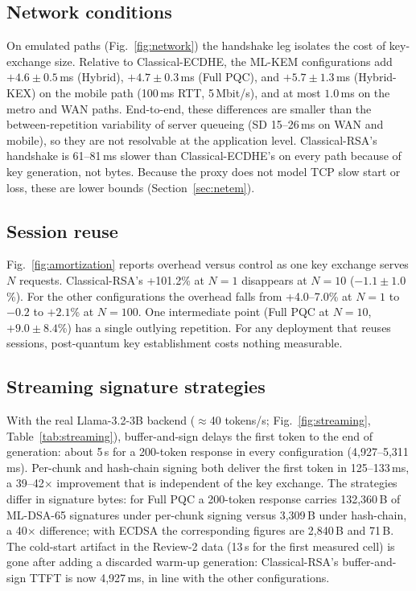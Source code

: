 \subsection{Network conditions}\label{sec:res-network}
On emulated paths (Fig.~\ref{fig:network}) the handshake leg isolates the cost of key-exchange size.
Relative to Classical-ECDHE, the ML-KEM configurations add $+4.6\pm0.5$\,ms (Hybrid),
$+4.7\pm0.3$\,ms (Full PQC), and $+5.7\pm1.3$\,ms (Hybrid-KEX) on the mobile path (100\,ms RTT,
5\,Mbit/s), and at most $1.0$\,ms on the metro and WAN paths. End-to-end, these differences are smaller
than the between-repetition variability of server queueing (SD 15--26\,ms on WAN and mobile), so
they are not resolvable at the application level. Classical-RSA's handshake is 61--81\,ms slower
than Classical-ECDHE's on every path because of key generation, not bytes. Because the proxy does
not model TCP slow start or loss, these are lower bounds (Section~\ref{sec:netem}).

\subsection{Session reuse}\label{sec:res-amortization}
Fig.~\ref{fig:amortization} reports overhead versus control as one key exchange serves $N$
requests. Classical-RSA's +101.2\% at $N{=}1$ disappears at $N{=}10$ ($-1.1\pm1.0$\%). For the
other configurations the overhead falls from +4.0--7.0\% at $N{=}1$ to $-0.2$ to $+2.1$\% at
$N{=}100$. One intermediate point (Full PQC at $N{=}10$, $+9.0\pm8.4$\%) has a single outlying
repetition. For any deployment that reuses sessions, post-quantum key establishment costs nothing
measurable.

\subsection{Streaming signature strategies}\label{sec:res-streaming}
With the real Llama-3.2-3B backend ($\approx$40 tokens/s; Fig.~\ref{fig:streaming},
Table~\ref{tab:streaming}), buffer-and-sign delays the first token to the end of generation: about
5\,s for a 200-token response in every configuration (4,927--5,311\,ms). Per-chunk and hash-chain
signing both deliver the first token in 125--133\,ms, a 39--42$\times$ improvement that is
independent of the key exchange. The strategies differ in signature bytes: for Full PQC a
200-token response carries 132,360\,B of ML-DSA-65 signatures under per-chunk signing versus
3,309\,B under hash-chain, a 40$\times$ difference; with ECDSA the corresponding figures are
2,840\,B and 71\,B. The cold-start artifact in the Review-2 data (13\,s for the first measured cell)
is gone after adding a discarded warm-up generation: Classical-RSA's buffer-and-sign TTFT is now
4,927\,ms, in line with the other configurations.

